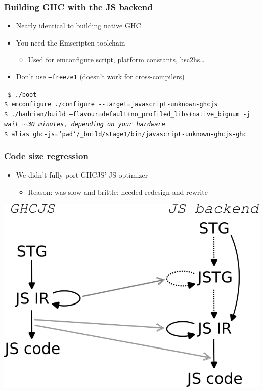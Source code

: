\documentclass{beamer}
\begin{document}
\begin{frame}[fragile]
\frametitle{Building GHC with the JS backend}
\begin{itemize}
\item Nearly identical to building native GHC
\item You need the Emscripten toolchain
\begin{itemize}
\item Used for emconfigure script, platform constants, hsc2hs…
\end{itemize}
  \item \alert{Don't use \texttt{--freeze1} (doesn't work for cross-compilers)}
\end{itemize}

\vspace{1cm}

\texttt
{\footnotesize
\$ ./boot \\
\$ \alert{emconfigure} ./configure -{}-target=\alert{javascript-unknown-ghcjs} \\
\$ ./hadrian/build --flavour=default+no\_profiled\_libs+\alert{native\_bignum} -j \\
\vspace{0.5cm}
\textit{wait $\sim$30 minutes, depending on your hardware} \\
\vspace{0.5cm}
\$ alias ghc-js=`pwd`/\_build/stage1/bin/javascript-unknown-ghcjs-ghc\\
}
\end{frame}


\begin{frame}
\frametitle{Code size regression}
\begin{itemize}
\item We didn’t fully port GHCJS’ JS optimizer
\begin{itemize}
\item Reason: was slow and brittle; needed redesign and rewrite
\end{itemize}
\end{itemize}
\hspace{1cm}
\begin{center}
\includegraphics[scale=0.4]{images/pipelines.png}
\end{center}
\end{frame}
\end{document}
